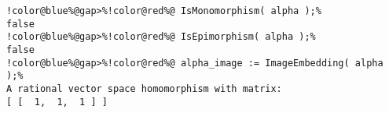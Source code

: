 \begin{Verbatim}[commandchars=!@\%,frame=single]
!color@blue%@gap>%!color@red%@ IsMonomorphism( alpha );%
false
!color@blue%@gap>%!color@red%@ IsEpimorphism( alpha );%
false
!color@blue%@gap>%!color@red%@ alpha_image := ImageEmbedding( alpha );%
A rational vector space homomorphism with matrix: 
[ [  1,  1,  1 ] ]
\end{Verbatim}
